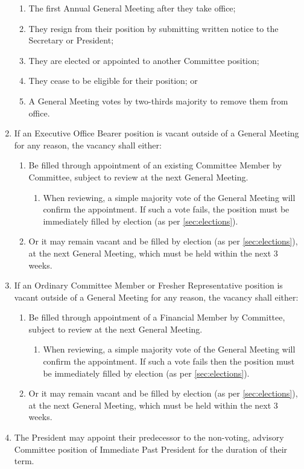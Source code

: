 \documentclass[a4paper]{article}
\begin{document}
\begin{enumerate}
\begin{enumerate}
              \item The first Annual General Meeting after they take office;
              \item They resign from their position by submitting written notice to the Secretary or President;
              \item They are elected or appointed to another Committee position;
              \item They cease to be eligible for their position; or
              \item A General Meeting votes by two-thirds majority to remove them from office.
          \end{enumerate}
    \item If an Executive Office Bearer position is vacant outside of a General Meeting for any reason, the vacancy shall either:
          \begin{enumerate}
              \item Be filled through appointment of an existing Committee Member by Committee, subject to review at the next General Meeting.
                    \begin{enumerate}
                        \item When reviewing, a simple majority vote of the General Meeting will confirm the appointment. If such a vote fails, the position must be immediately filled by election (as per \cref{sec:elections}).
                    \end{enumerate}
              \item Or it may remain vacant and be filled by election (as per \cref{sec:elections}), at the next General Meeting, which must be held within the next 3 weeks.
          \end{enumerate}
    \item If an Ordinary Committee Member or Fresher Representative position is vacant outside of a General Meeting for any reason, the vacancy shall either:
          \begin{enumerate}
              \item Be filled through appointment of a Financial Member by Committee, subject to review at the next General Meeting.
                    \begin{enumerate}
                        \item When reviewing, a simple majority vote of the General Meeting will confirm the appointment. If such a vote fails then the position must be immediately filled by election (as per \cref{sec:elections}).
                    \end{enumerate}
              \item Or it may remain vacant and be filled by election (as per \cref{sec:elections}), at the next General Meeting, which must be held within the next 3 weeks.
          \end{enumerate}
    \item The President may appoint their predecessor to the non-voting, advisory Committee position of Immediate Past President for the duration of their term.
\end{enumerate}
\end{document}
